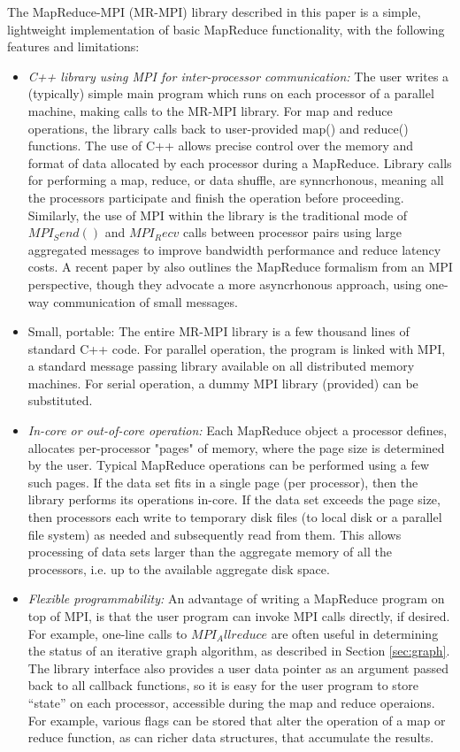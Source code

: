 The MapReduce-MPI (MR-MPI) library described in this paper is a
simple, lightweight implementation of basic MapReduce functionality,
with the following features and limitations:

\begin{itemize}

\item {\it C++ library using MPI for inter-processor communication:}
The user writes a (typically) simple main program which runs on each
processor of a parallel machine, making calls to the MR-MPI library.
For map and reduce operations, the library calls back to user-provided
map() and reduce() functions.  The use of C++ allows precise control
over the memory and format of data allocated by each processor during
a MapReduce.  Library calls for performing a map, reduce, or data
shuffle, are synncrhonous, meaning all the processors participate and
finish the operation before proceeding.  Similarly, the use of MPI
within the library is the traditional mode of $MPI_Send()$ and
$MPI_Recv$ calls between processor pairs using large aggregated
messages to improve bandwidth performance and reduce latency costs.  A
recent paper by \cite{Dongarra} also outlines the MapReduce formalism
from an MPI perspective, though they advocate a more asyncrhonous
approach, using one-way communication of small messages.

\item {Small, portable:} The entire MR-MPI library is a few thousand
lines of standard C++ code.  For parallel operation, the program is
linked with MPI, a standard message passing library available on all
distributed memory machines.  For serial operation, a dummy MPI
library (provided) can be substituted.

\item {\it In-core or out-of-core operation:} Each MapReduce object a
processor defines, allocates per-processor "pages" of memory, where
the page size is determined by the user.  Typical MapReduce operations
can be performed using a few such pages.  If the data set fits in a
single page (per processor), then the library performs its operations
in-core.  If the data set exceeds the page size, then processors each
write to temporary disk files (to local disk or a parallel file
system) as needed and subsequently read from them.  This allows
processing of data sets larger than the aggregate memory of all the
processors, i.e. up to the available aggregate disk space.

\item {\it Flexible programmability:} An advantage of writing a
MapReduce program on top of MPI, is that the user program can invoke
MPI calls directly, if desired.  For example, one-line calls to
$MPI_Allreduce$ are often useful in determining the status of an
iterative graph algorithm, as described in Section \ref{sec:graph}.
The library interface also provides a user data pointer as an argument
passed back to all callback functions, so it is easy for the user
program to store ``state'' on each processor, accessible during the
map and reduce operaions.  For example, various flags can be stored
that alter the operation of a map or reduce function, as can richer
data structures, that accumulate the results.


\end{itemize}
